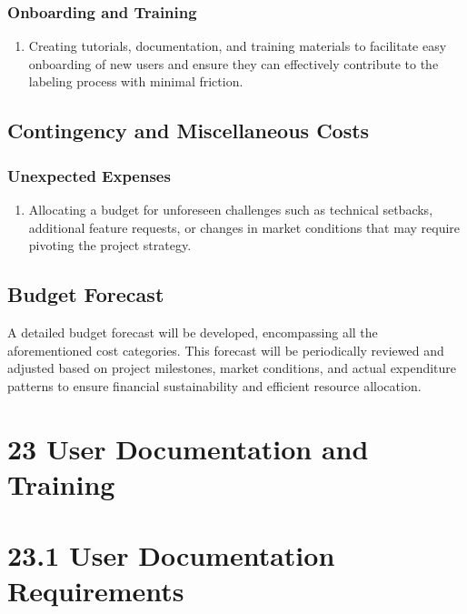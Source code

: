 \documentclass[12pt]{article}
\begin{document}
\subsubsection{Onboarding and Training}
\begin{enumerate}
  \item Creating tutorials, documentation, and training materials to facilitate easy onboarding of new users and ensure they can effectively contribute to the labeling process with minimal friction.
  \end{enumerate}

\subsection{Contingency and Miscellaneous Costs}
\subsubsection{Unexpected Expenses}
\begin{enumerate}
  \item Allocating a budget for unforeseen challenges such as technical setbacks, additional feature requests, or changes in market conditions that may require pivoting the project strategy.
  \end{enumerate}

\subsection{Budget Forecast}
A detailed budget forecast will be developed, encompassing all the aforementioned cost categories. This forecast will be periodically reviewed and adjusted based on project milestones, market conditions, and actual expenditure patterns to ensure financial sustainability and efficient resource allocation.



\section*{23 User Documentation and Training}

\section*{23.1 User Documentation Requirements}
\end{document}
